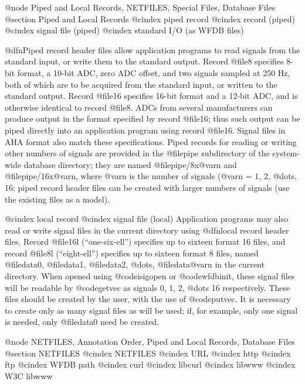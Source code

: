 {{{{{{{{{{@node     Piped and Local Records, NETFILES, Special Files, Database Files
@section Piped and Local Records
@cindex piped record
@cindex record (piped)
@cindex signal file (piped)
@cindex standard I/O (as WFDB files)

@dfn{Piped record} header files allow application programs to read signals from
the standard input, or write them to the standard output.  Record @file{8}
specifies 8-bit format, a 10-bit ADC, zero ADC offset, and two signals sampled
at 250 Hz, both of which are to be acquired from the standard input, or written
to the standard output.  Record @file{16} specifies 16-bit format and a 12-bit
ADC, and is otherwise identical to record @file{8}.  ADCs from several
manufacturers can produce output in the format specified by record @file{16};
thus such output can be piped directly into an application program using record
@file{16}.  Signal files in AHA format also match these specifications.  Piped
records for reading or writing other numbers of signals are provided in the
@file{pipe} subdirectory of the system-wide database directory; they are named
@file{pipe/8x@var{n}} and @file{pipe/16x@var{n}}, where @var{n} is the number
of signals (@var{n} = 1, 2, @dots{}, 16; piped record header files can be
created with larger numbers of signals (use the existing files as a model).

@cindex local record
@cindex signal file (local)
Application programs may also read or write signal files in the current
directory using @dfn{local record} header files.  Record
@file{16l} (``one-six-ell'') specifies up to sixteen format 16
files, and record @file{8l} (``eight-ell'') specifies up to
sixteen format 8 files, named @file{data0}, @file{data1},
@file{data2}, @dots{}, @file{data@var{n}} in the current directory.
When opened using @code{isigopen} or @code{wfdbinit}, these signal files
will be readable by @code{getvec} as signals 0, 1, 2, @dots{} 16
respectively.  These files should be created by the user, with the use
of @code{putvec}.  It is necessary to create only as many signal files
as will be used; if, for example, only one signal is needed, only
@file{data0} need be created.


@node     NETFILES, Annotation Order, Piped and Local Records, Database Files
@section NETFILES
@cindex NETFILES
@cindex URL
@cindex http
@cindex ftp
@cindex WFDB path
@cindex curl
@cindex libcurl
@cindex libwww
@cindex W3C libwww

}}}}}}}}}}
